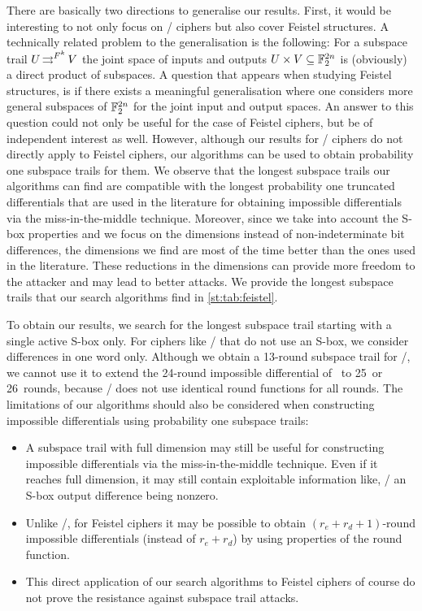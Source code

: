 There are basically two directions to generalise our results.
First, it would be interesting to not only focus on \SPN/ ciphers but also cover Feistel structures.
A technically related problem to the generalisation is the following: For a subspace trail $U \operatorname*{\rightrightarrows}^{F^k}_{} V$ the joint space of inputs and outputs $U \times V \subseteq \mathbb{F}_2^{2n}$ is (obviously) a direct product of subspaces.
A question that appears when studying Feistel structures, is if there exists a meaningful generalisation where one considers more general subspaces of $\mathbb{F}_2^{2n}$ for the joint input and output spaces.
An answer to this question could not only be useful for the case of Feistel ciphers, but be of independent interest as well.
However, although our results for \SPN/ ciphers do not directly apply to Feistel ciphers, our algorithms can be used to obtain probability one subspace trails for them.
We observe that the longest subspace trails our algorithms can find are compatible with the longest probability one truncated differentials that are used in the literature for obtaining impossible differentials via the miss-in-the-middle technique.
Moreover, since we take into account the S-box properties and we focus on the dimensions instead of non-indeterminate bit differences, the dimensions we find are most of the time better than the ones used in the literature.
These reductions in the dimensions can provide more freedom to the attacker and may lead to better attacks.
We provide the longest subspace trails that our search algorithms find in \cref{st:tab:feistel}.

To obtain our results, we search for the longest subspace trail starting with a single active S-box only.
For ciphers like \simon/ that do not use an S-box, we consider differences in one word only.
Although we obtain a 13-round subspace trail for \skipjack/, we cannot use it to extend the 24-round impossible differential of~\cite{EC:BihBirSha99,JC:BhBirSha05} to 25~or 26~rounds, because \skipjack/ does not use identical round functions for all rounds.
The limitations of our algorithms should also be considered when constructing impossible differentials using probability one subspace trails:
\begin{itemize}
\item A subspace trail with full dimension may still be useful for constructing impossible differentials via the miss-in-the-middle technique.
        Even if it reaches full dimension, it may still contain exploitable information like, \eg/ an S-box output difference being nonzero.
\item Unlike \SPN/, for Feistel ciphers it may be possible to obtain $(r_e+r_d+1)$-round impossible differentials (instead of $r_e+r_d$) by using properties of the round function.
\item This direct application of our search algorithms to Feistel ciphers of course do not prove the resistance against subspace trail attacks.
\end{itemize}

